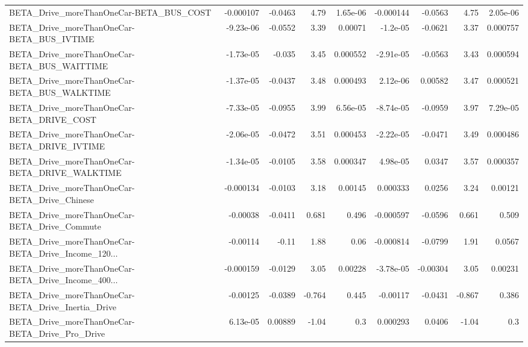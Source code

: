 \begin{tabular}{lrrrrrrrr}
BETA\_Drive\_moreThanOneCar-BETA\_BUS\_COST            &   -0.000107 &      -0.0463 &     4.79 & 1.65e-06 &  -0.000144 &     -0.0563 &         4.75 &      2.05e-06 \\
BETA\_Drive\_moreThanOneCar-BETA\_BUS\_IVTIME          &   -9.23e-06 &      -0.0552 &     3.39 &  0.00071 &   -1.2e-05 &     -0.0621 &         3.37 &      0.000757 \\
BETA\_Drive\_moreThanOneCar-BETA\_BUS\_WAITTIME        &   -1.73e-05 &       -0.035 &     3.45 & 0.000552 &  -2.91e-05 &     -0.0563 &         3.43 &      0.000594 \\
BETA\_Drive\_moreThanOneCar-BETA\_BUS\_WALKTIME        &   -1.37e-05 &      -0.0437 &     3.48 & 0.000493 &   2.12e-06 &     0.00582 &         3.47 &      0.000521 \\
BETA\_Drive\_moreThanOneCar-BETA\_DRIVE\_COST          &   -7.33e-05 &      -0.0955 &     3.99 & 6.56e-05 &  -8.74e-05 &     -0.0959 &         3.97 &      7.29e-05 \\
BETA\_Drive\_moreThanOneCar-BETA\_DRIVE\_IVTIME        &   -2.06e-05 &      -0.0472 &     3.51 & 0.000453 &  -2.22e-05 &     -0.0471 &         3.49 &      0.000486 \\
BETA\_Drive\_moreThanOneCar-BETA\_DRIVE\_WALKTIME      &   -1.34e-05 &      -0.0105 &     3.58 & 0.000347 &   4.98e-05 &      0.0347 &         3.57 &      0.000357 \\
BETA\_Drive\_moreThanOneCar-BETA\_Drive\_Chinese       &   -0.000134 &      -0.0103 &     3.18 &  0.00145 &   0.000333 &      0.0256 &         3.24 &       0.00121 \\
BETA\_Drive\_moreThanOneCar-BETA\_Drive\_Commute       &    -0.00038 &      -0.0411 &    0.681 &    0.496 &  -0.000597 &     -0.0596 &        0.661 &         0.509 \\
BETA\_Drive\_moreThanOneCar-BETA\_Drive\_Income\_120... &    -0.00114 &        -0.11 &     1.88 &     0.06 &  -0.000814 &     -0.0799 &         1.91 &        0.0567 \\
BETA\_Drive\_moreThanOneCar-BETA\_Drive\_Income\_400... &   -0.000159 &      -0.0129 &     3.05 &  0.00228 &  -3.78e-05 &    -0.00304 &         3.05 &       0.00231 \\
BETA\_Drive\_moreThanOneCar-BETA\_Drive\_Inertia\_Drive &    -0.00125 &      -0.0389 &   -0.764 &    0.445 &   -0.00117 &     -0.0431 &       -0.867 &         0.386 \\
BETA\_Drive\_moreThanOneCar-BETA\_Drive\_Pro\_Drive     &    6.13e-05 &      0.00889 &    -1.04 &      0.3 &   0.000293 &      0.0406 &        -1.04 &           0.3 \\

\end{tabular}
